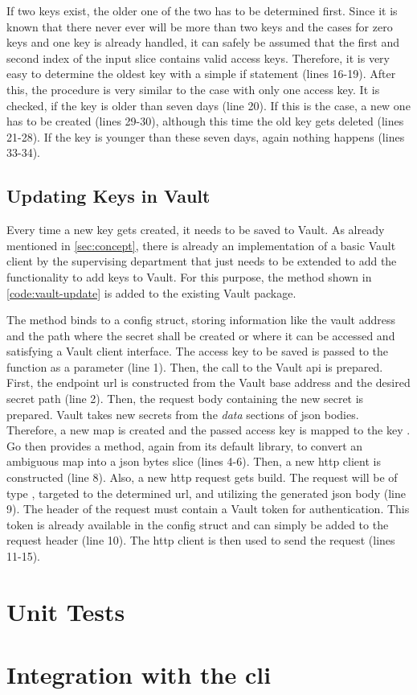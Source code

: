 If two keys exist, the older one of the two has to be determined first.
Since it is known that there never ever will be more than two keys and the cases for zero keys and one key is already handled, it can safely be assumed that the first and second index of the input slice contains valid access keys.
Therefore, it is very easy to determine the oldest key with a simple if statement (lines 16-19).
After this, the procedure is very similar to the case with only one access key.
It is checked, if the key is older than seven days (line 20).
If this is the case, a new one has to be created (lines 29-30), although this time the old key gets deleted (lines 21-28).
If the key is younger than these seven days, again nothing happens (lines 33-34).



\subsection{Updating Keys in Vault}
Every time a new key gets created, it needs to be saved to Vault.
As already mentioned in \autoref{sec:concept}, there is already an implementation of a basic Vault client by the supervising department that just needs to be extended to add the functionality to add keys to Vault.
For this purpose, the method shown in \autoref{code:vault-update} is added to the existing Vault package.

The method binds to a config struct, storing information like the vault address and the path where the secret shall be created or where it can be accessed and satisfying a Vault client interface.
The access key to be saved is passed to the function as a parameter (line 1).
Then, the call to the Vault \ac{api} is prepared.
First, the endpoint \ac{url} is constructed from the Vault base address and the desired secret path (line 2).
Then, the request body containing the new secret is prepared.
Vault takes new secrets from the \emph{data} sections of \ac{json} bodies.
Therefore, a new map is created and the passed access key is mapped to the key .
Go then provides a method, again from its default library, to convert an ambiguous map into a \ac{json} bytes slice (lines 4-6).
Then, a new \ac{http} client is constructed (line 8).
Also, a new \ac{http} request gets build.
The request will be of type , targeted to the determined \ac{url}, and utilizing the generated \ac{json} body (line 9).
The header of the request must contain a Vault token for authentication.
This token is already available in the config struct and can simply be added to the request header (line 10).
The \ac{http} client is then used to send the request (lines 11-15).



\section{Unit Tests}

\section{Integration with the \ac{cli}}